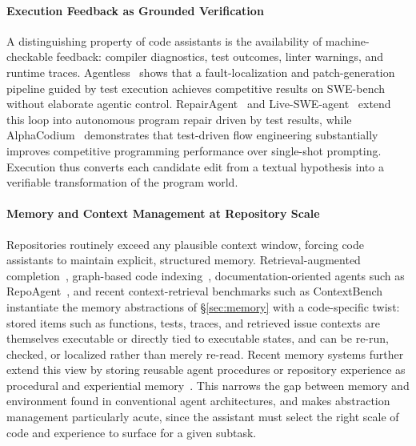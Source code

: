 \documentclass{llmxive}
\begin{document}
\paragraph{Execution Feedback as Grounded Verification}
A distinguishing property of code assistants is the availability of machine-checkable feedback: compiler diagnostics, test outcomes, linter warnings, and runtime traces.
Agentless~\cite{xia2024agentless} shows that a fault-localization and patch-generation pipeline guided by test execution achieves competitive results on SWE-bench~\cite{jimenez2024swebench} without elaborate agentic control.
RepairAgent~\cite{bouzenia2025repairagent} and Live-SWE-agent~\cite{xia2025live} extend this loop into autonomous program repair driven by test results, while AlphaCodium~\cite{ridnik2024alphacodium} demonstrates that test-driven flow engineering substantially improves competitive programming performance over single-shot prompting.
Execution thus converts each candidate edit from a textual hypothesis into a verifiable transformation of the program world.

\paragraph{Memory and Context Management at Repository Scale}
Repositories routinely exceed any plausible context window, forcing code assistants to maintain explicit, structured memory.
Retrieval-augmented completion~\cite{zhang2023repocoder}, graph-based code indexing~\cite{liu2024codexgraphbridginglargelanguage}, documentation-oriented agents such as RepoAgent~\cite{luo-etal-2024-repoagent}, and recent context-retrieval benchmarks such as ContextBench~\cite{li2026contextbench} instantiate the memory abstractions of \S\ref{sec:memory} with a code-specific twist: stored items such as functions, tests, traces, and retrieved issue contexts are themselves executable or directly tied to executable states, and can be re-run, checked, or localized rather than merely re-read.
Recent memory systems further extend this view by storing reusable agent procedures or repository experience as procedural and experiential memory~\cite{gaurav2025codemem,wang2026memgovern}.
This narrows the gap between memory and environment found in conventional agent architectures, and makes abstraction management particularly acute, since the assistant must select the right scale of code and experience to surface for a given subtask.
\end{document}
